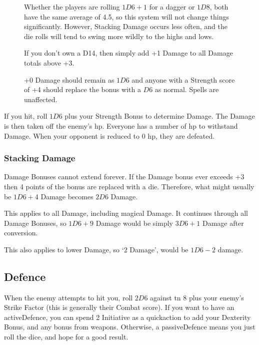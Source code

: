 \begin{multicols}{2}
{\begin{figure*}[t]
\begin{tcolorbox}[title=Dicey Damage]
			Whether the players are rolling $1D6+1$ for a dagger or $1D8$, both have the same average of 4.5, so this system will not change things significantly.
			However, Stacking Damage occurs less often, and the die rolls will tend to swing more wildly to the highs and lows.
			
			If you don't own a D14, then simply add +1 Damage to all Damage totals above +3.
			
			+0 Damage should remain as $1D6$ and anyone with a Strength score of +4 should replace the bonus with a $D6$ as normal.
			Spells are unaffected.
	
		\end{tcolorbox}
	\end{figure*}

}{}

If you hit, roll $1D6$ plus your Strength Bonus to determine Damage.
The Damage is then taken off the enemy's \gls{hp}.
Everyone has a number of \gls{hp} to withstand Damage. When your opponent is reduced to 0 \gls{hp}, they are defeated.

\subsubsection{Stacking Damage}

Damage Bonuses cannot extend forever. If the Damage bonus ever exceeds +3 then 4 points of the bonus are replaced with a die. Therefore, what might usually be $1D6+4$ Damage becomes $2D6$ Damage.

This applies to all Damage, including magical Damage. It continues through all Damage Bonuses, so $1D6+9$ Damage would be simply $3D6+1$ Damage after conversion.

This also applies to lower Damage, so `2 Damage', would be $1D6-2$ damage.

\subsection{Defence}
\label{defence}

When the enemy attempts to hit you, roll $2D6$ against \gls{tn} 8 plus your enemy's Strike Factor (this is generally their Combat score).
If you want to have an \gls{activeDefence}, you can spend 2 Initiative as a \gls{quickaction} to add your Dexterity Bonus, and any bonus from weapons.
Otherwise, a \gls{passiveDefence} means you just roll the dice, and hope for a good result.


\end{multicols}
